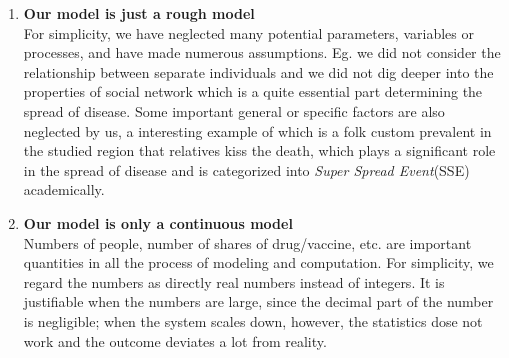 \begin{enumerate}
\item \textbf{Our model is just a rough model} \\
For simplicity, we have neglected many potential parameters, variables or processes, and have made numerous assumptions. Eg. we did not consider the relationship between separate individuals and we did not dig deeper into the properties of social network which is a quite essential part determining the spread of disease. Some important general or specific factors are also neglected by us, a interesting example of which is a folk custom prevalent in the studied region that relatives kiss the death, which plays a significant role in the spread of disease and is categorized into \emph{Super Spread Event}(SSE) academically. 

\item \textbf{Our model is only a continuous model} \\
Numbers of people, number of shares of drug/vaccine, etc. are important quantities in all the process of modeling and computation. For simplicity, we regard the numbers as directly real numbers instead of integers. It is justifiable when the numbers are large, since the decimal part of the number is negligible; when the system scales down, however, the statistics dose not work and the outcome deviates a lot from reality.
\end{enumerate}